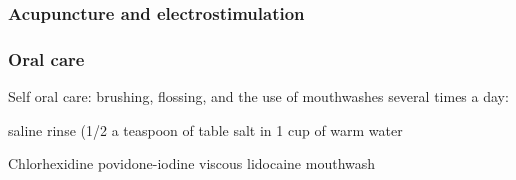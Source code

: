 \documentclass[
paper=landscape,
paper=160mm:90mm, %
fontsize=11pt, %
pagesize, %
parskip=half-, %
]{scrartcl} %
\theoremstyle{mythmstyle} %
\begin{document}
\clearpage
\subsubsection{Acupuncture and electrostimulation}

\subsubsection{Oral care}

Self oral care: brushing, flossing, and the use of mouthwashes several times a day:
\begin{outline}
    \1 saline rinse (1/2 a teaspoon of table salt in 1 cup of warm water

    \1 Chlorhexidine
    \1 povidone-iodine
    \1 viscous lidocaine mouthwash
\end{outline}
\end{document}
